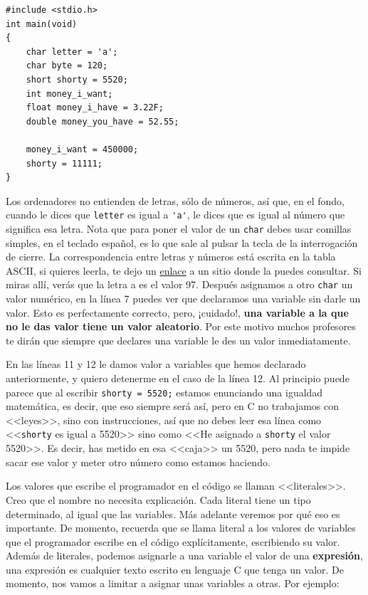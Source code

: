 \documentclass[a4paper]{article}
\begin{document}
\noindent
\begin{minipage}[H]{\linewidth}
\mbox{}
\begin{lstlisting}[style=C, caption={Creación y asignación de variables},
label={lst:variableAsignation}]
#include <stdio.h>
int main(void)
{
    char letter = 'a';
    char byte = 120;
    short shorty = 5520;
    int money_i_want;
    float money_i_have = 3.22F;
    double money_you_have = 52.55;

    money_i_want = 450000;
    shorty = 11111;
}
\end{lstlisting}
\end{minipage}

Los ordenadores no entienden de letras, sólo de números, así que, en el fondo,
cuando le dices que \verb!letter! es igual a \verb!'a'!, le dices que es igual
al número que significa esa letra. Nota que para poner el valor de un
\texttt{char} debes usar comillas simples, en el teclado español, es lo que
sale al pulsar la tecla de la interrogación de cierre.
La correspondencia entre letras y números está escrita en la tabla ASCII, si
quieres leerla, te dejo un \href{https://elcodigoascii.com.ar/}{enlace}
a un sitio donde la puedes consultar.
Si miras allí, verás que la letra a es el valor
97. Después asignamos a otro \verb!char!
un valor numérico, en la línea 7 puedes ver que declaramos una variable sin
darle un valor. Esto es perfectamente correcto, pero, ¡cuidado!,
\textbf{una variable a la que no le das valor tiene un valor aleatorio}.
Por este motivo muchos profesores te dirán que siempre que declares
una variable le des un valor inmediatamente.

En las líneas 11 y 12 le damos
valor a variables que hemos declarado anteriormente, y quiero detenerme en el
caso de la línea 12. Al principio puede parece que al escribir
\verb!shorty = 5520;! estamos enunciando una igualdad matemática, es decir,
que eso siempre será así, pero en C no trabajamos con <<leyes>>, sino con
instrucciones, así que no debes leer esa línea como <<\verb!shorty! es igual a
5520>> sino como <<He asignado a \verb!shorty! el valor 5520>>. Es decir, has
metido en esa <<caja>> un 5520, pero nada te impide sacar ese valor y meter
otro número como estamos haciendo.

Los valores que escribe el programador en el código se llaman <<literales>>.
Creo que el nombre no necesita explicación. Cada literal tiene un tipo
determinado, al igual que las variables. Más adelante veremos por qué eso es
importante. De momento, recuerda que se llama literal a los valores de
variables que el programador escribe en el código explícitamente, escribiendo
su valor.
Además de literales, podemos asignarle a una
variable el valor de una \textbf{expresión}, una expresión es cualquier
texto escrito en lenguaje C que tenga un valor. De momento, nos vamos a limitar
a asignar unas variables a otras. Por ejemplo:
\end{document}
